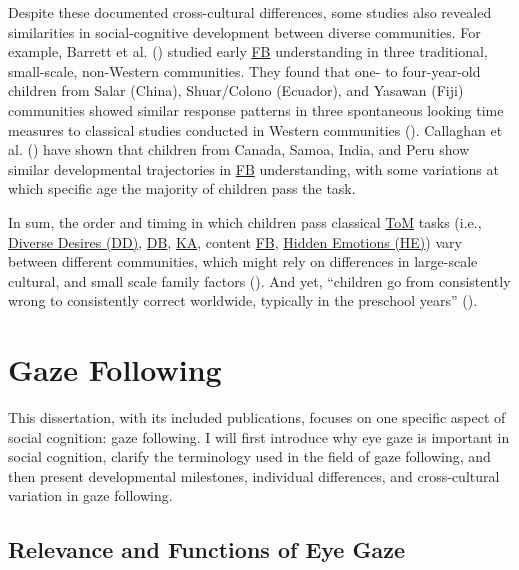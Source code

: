 \documentclass[
]{scrbook}
\begin{document}
Despite these documented cross-cultural differences, some studies also revealed similarities in social-cognitive development between diverse communities. For example, Barrett et al. () studied early \hyperref[acronyms_FB]{FB} understanding in three traditional, small-scale, non-Western communities. They found that one- to four-year-old children from Salar (China), Shuar/Colono (Ecuador), and Yasawan (Fiji) communities showed similar response patterns in three spontaneous looking time measures to classical studies conducted in Western communities (). Callaghan et al. () have shown that children from Canada, Samoa, India, and Peru show similar developmental trajectories in \hyperref[acronyms_FB]{FB} understanding, with some variations at which specific age the majority of children pass the task.

In sum, the order and timing in which children pass classical \hyperref[acronyms_ToM]{ToM} tasks (i.e., \hyperref[acronyms_DD]{Diverse Desires (DD)}, \hyperref[acronyms_DB]{DB}, \hyperref[acronyms_KA]{KA}, content \hyperref[acronyms_FB]{FB}, \hyperref[acronyms_HE]{Hidden Emotions (HE)}) vary between different communities, which might rely on differences in large-scale cultural, and small scale family factors (). And yet, ``children go from consistently wrong to consistently correct worldwide, typically in the preschool years'' ().

\section{Gaze Following}\label{intro-gaze}

This dissertation, with its included publications, focuses on one specific aspect of social cognition: gaze following. I will first introduce why eye gaze is important in social cognition, clarify the terminology used in the field of gaze following, and then present developmental milestones, individual differences, and cross-cultural variation in gaze following.

\subsection{Relevance and Functions of Eye Gaze}\label{relevance-and-functions-of-eye-gaze}
\end{document}
